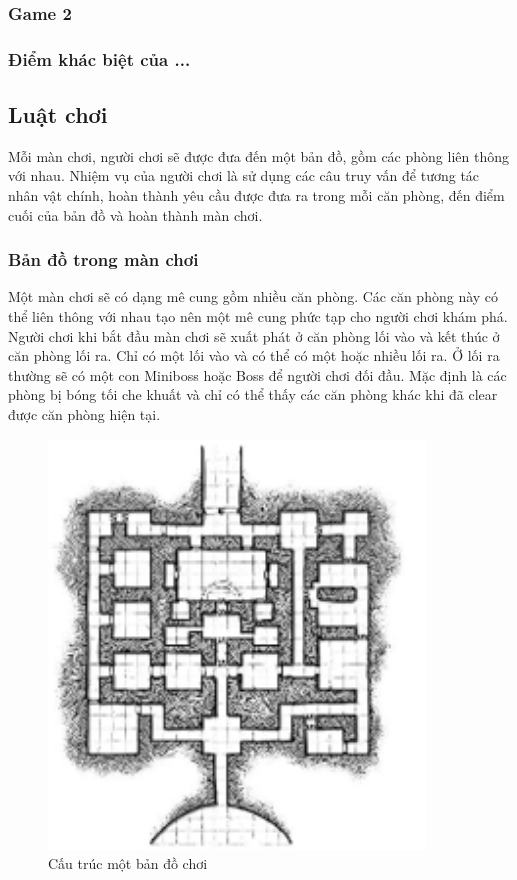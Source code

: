 \subsubsection{Game 2}
\subsubsection{Điểm khác biệt của ...}

\subsection{Luật chơi}
\hspace*{1cm} Mỗi màn chơi, người chơi sẽ được đưa đến một bản đồ, gồm các phòng liên thông với nhau. Nhiệm vụ của người chơi là sử dụng các câu truy vấn để tương tác nhân vật chính, hoàn thành yêu cầu được đưa ra trong mỗi căn phòng, đến điểm cuối của bản đồ và hoàn thành màn chơi.

\subsubsection{Bản đồ trong màn chơi}
\hspace*{1cm}Một màn chơi sẽ có dạng mê cung gồm nhiều căn phòng. Các căn phòng này có thể liên thông với nhau tạo nên một mê cung phức tạp cho người chơi khám phá. Người chơi khi bắt đầu màn chơi sẽ xuất phát ở căn phòng lối vào và kết thúc ở căn phòng lối ra. Chỉ có một lối vào và có thể có một hoặc nhiều lối ra. Ở lối ra thường sẽ có một con Miniboss hoặc Boss để người chơi đối đầu. Mặc định là các phòng bị bóng tối che khuất và chỉ có thể thấy các căn phòng khác khi đã clear được căn phòng hiện tại.\\

\begin{figure}[H]
	\centering
	\includegraphics[width=10cm]{Images/MapStructure.png}
	\vspace{0.5cm}
	\caption{Cấu trúc một bản đồ chơi}
\end{figure}

